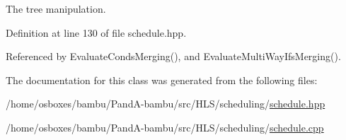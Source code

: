 The tree manipulation. 



Definition at line 130 of file schedule.\+hpp.



Referenced by Evaluate\+Conds\+Merging(), and Evaluate\+Multi\+Way\+Ifs\+Merging().



The documentation for this class was generated from the following files\+:\begin{DoxyCompactItemize}
\item 
/home/osboxes/bambu/\+Pand\+A-\/bambu/src/\+H\+L\+S/scheduling/\hyperlink{schedule_8hpp}{schedule.\+hpp}\item 
/home/osboxes/bambu/\+Pand\+A-\/bambu/src/\+H\+L\+S/scheduling/\hyperlink{schedule_8cpp}{schedule.\+cpp}\end{DoxyCompactItemize}
